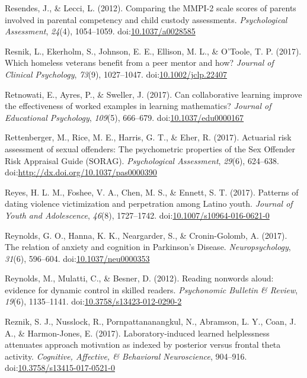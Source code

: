 \documentclass[english,man]{apa6}
\theoremstyle{definition}
\theoremstyle{definition}
\theoremstyle{definition}
\theoremstyle{remark}
\begin{document}
\hypertarget{ref-Resendes2012}{}
Resendes, J., \& Lecci, L. (2012). Comparing the MMPI-2 scale scores of
parents involved in parental competency and child custody assessments.
\emph{Psychological Assessment}, \emph{24}(4), 1054--1059.
doi:\href{https://doi.org/10.1037/a0028585}{10.1037/a0028585}

\hypertarget{ref-Resnik2017}{}
Resnik, L., Ekerholm, S., Johnson, E. E., Ellison, M. L., \& O'Toole, T.
P. (2017). Which homeless veterans benefit from a peer mentor and how?
\emph{Journal of Clinical Psychology}, \emph{73}(9), 1027--1047.
doi:\href{https://doi.org/10.1002/jclp.22407}{10.1002/jclp.22407}

\hypertarget{ref-Retnowati2017}{}
Retnowati, E., Ayres, P., \& Sweller, J. (2017). Can collaborative
learning improve the effectiveness of worked examples in learning
mathematics? \emph{Journal of Educational Psychology}, \emph{109}(5),
666--679.
doi:\href{https://doi.org/10.1037/edu0000167}{10.1037/edu0000167}

\hypertarget{ref-Rettenberger2017}{}
Rettenberger, M., Rice, M. E., Harris, G. T., \& Eher, R. (2017).
Actuarial risk assessment of sexual offenders: The psychometric
properties of the Sex Offender Risk Appraisal Guide (SORAG).
\emph{Psychological Assessment}, \emph{29}(6), 624--638.
doi:\href{https://doi.org/http://dx.doi.org/10.1037/pas0000390}{http://dx.doi.org/10.1037/pas0000390}

\hypertarget{ref-Reyes2017}{}
Reyes, H. L. M., Foshee, V. A., Chen, M. S., \& Ennett, S. T. (2017).
Patterns of dating violence victimization and perpetration among Latino
youth. \emph{Journal of Youth and Adolescence}, \emph{46}(8),
1727--1742.
doi:\href{https://doi.org/10.1007/s10964-016-0621-0}{10.1007/s10964-016-0621-0}

\hypertarget{ref-Reynolds2017}{}
Reynolds, G. O., Hanna, K. K., Neargarder, S., \& Cronin-Golomb, A.
(2017). The relation of anxiety and cognition in Parkinson's Disease.
\emph{Neuropsychology}, \emph{31}(6), 596--604.
doi:\href{https://doi.org/10.1037/neu0000353}{10.1037/neu0000353}

\hypertarget{ref-Reynolds2012}{}
Reynolds, M., Mulatti, C., \& Besner, D. (2012). Reading nonwords aloud:
evidence for dynamic control in skilled readers. \emph{Psychonomic
Bulletin \& Review}, \emph{19}(6), 1135--1141.
doi:\href{https://doi.org/10.3758/s13423-012-0290-2}{10.3758/s13423-012-0290-2}

\hypertarget{ref-Reznik2017}{}
Reznik, S. J., Nusslock, R., Pornpattananangkul, N., Abramson, L. Y.,
Coan, J. A., \& Harmon-Jones, E. (2017). Laboratory-induced learned
helplessness attenuates approach motivation as indexed by posterior
versus frontal theta activity. \emph{Cognitive, Affective, \& Behavioral
Neuroscience}, 904--916.
doi:\href{https://doi.org/10.3758/s13415-017-0521-0}{10.3758/s13415-017-0521-0}
\end{document}
